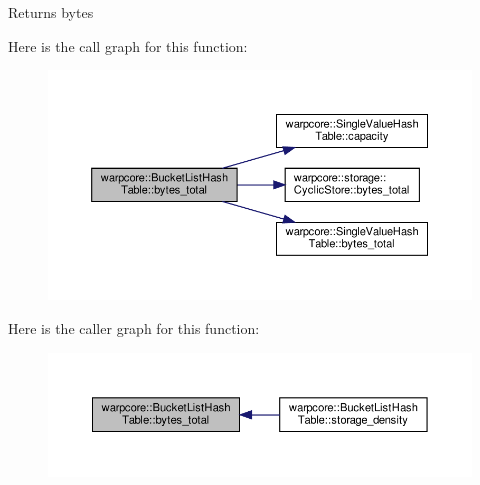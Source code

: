 \begin{DoxyReturn}{Returns}
bytes 
\end{DoxyReturn}
Here is the call graph for this function\+:
\nopagebreak
\begin{figure}[H]
\begin{center}
\leavevmode
\includegraphics[width=350pt]{classwarpcore_1_1BucketListHashTable_ae650ae236642939884805bdf2f825e2f_cgraph}
\end{center}
\end{figure}
Here is the caller graph for this function\+:
\nopagebreak
\begin{figure}[H]
\begin{center}
\leavevmode
\includegraphics[width=350pt]{classwarpcore_1_1BucketListHashTable_ae650ae236642939884805bdf2f825e2f_icgraph}
\end{center}
\end{figure}
\mbox{\label{classwarpcore_1_1BucketListHashTable_afbd37a57c5137cc44881470c80a60bc3}} 
